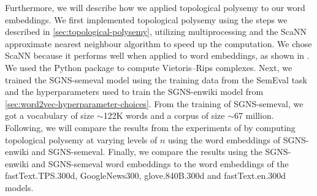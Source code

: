 Furthermore, we will describe how we applied topological polysemy to our word embeddings. We first implemented topological polysemy using the steps we described in \cref{sec:topological-polysemy}, utilizing multiprocessing and the ScaNN \cite{scann2020} approximate nearest neighbour algorithm to speed up the computation. We chose ScaNN because it performs well when applied to word embeddings, as shown in \cite{AnnBenchmarks2021}. We used the  \cite{ctralie2018ripser} Python package to compute Vietoris–Rips complexes. Next, we trained the SGNS-semeval model using the training data from the SemEval task and the hyperparameters used to train the SGNS-enwiki model from \cref{sec:word2vec-hyperparameter-choices}. From the training of SGNS-semeval, we got a vocabulary of size $\sim$122K words and a corpus of size $\sim$67 million. Following, we will compare the results from the experiments of \cite{jakubowski2020topology} by computing topological polysemy at varying levels of $n$ using the word embeddings of SGNS-enwiki and SGNS-semeval. Finally, we compare the results using the SGNS-enwiki and SGNS-semeval word embeddings to the word embeddings of the fastText.TPS.300d, GoogleNews300, glove.840B.300d and fastText.en.300d models.

